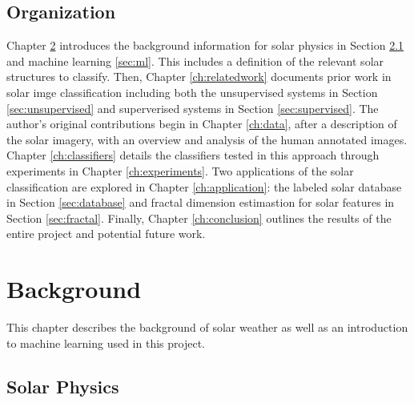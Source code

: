 \documentclass[twoside]{report}
\begin{document}
\section{Organization}
Chapter \ref{ch:background} introduces the background information for solar physics in Section \ref{sec:solphys} and machine learning \ref{sec:ml}. This includes a definition of the relevant solar structures to classify.  Then, Chapter \ref{ch:relatedwork} documents prior work in solar imge classification including both the unsupervised systems in Section \ref{sec:unsupervised} and superverised systems in Section \ref{sec:supervised}. The author's original contributions begin in Chapter \ref{ch:data}, after a description of the solar imagery, with an overview and analysis of the human annotated images. Chapter \ref{ch:classifiers} details the classifiers tested in this approach through experiments in Chapter \ref{ch:experiments}. Two applications of the solar classification are explored in Chapter \ref{ch:application}: the labeled solar database in Section \ref{sec:database} and fractal dimension estimastion for solar features in Section \ref{sec:fractal}. Finally, Chapter \ref{ch:conclusion} outlines the results of the entire project and potential future work. 

\chapter{Background} \label{ch:background}

This chapter describes the background of solar weather as well as an introduction to machine learning used in this project.  

\section{Solar Physics} \label{sec:solphys}
\end{document}
